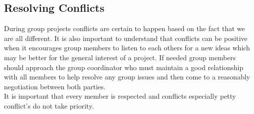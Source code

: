 \documentclass[a4paper,11pt]{article}
\begin{document}
\subsection{Resolving Conflicts}%
During group projects conflicts are certain to happen based on the fact that we are all different. It is also important to understand that conflicts can be positive when it encourages group members to listen to each others for a new ideas which may be better for the general interest of a project. If needed group members should approach the group coordinator who must maintain a good relationship with all members to help resolve any group issues and then come to a reasonably negotiation between both parties. \\It is important that every member is respected and conflicts especially petty conflict's do not take priority. 
\end{document}
